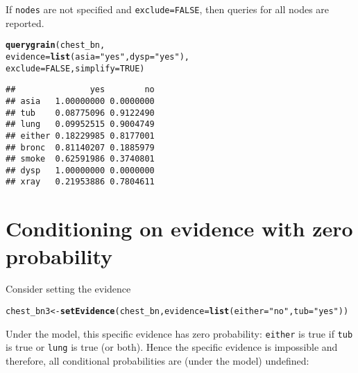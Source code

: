 \documentclass[10pt]{article}\usepackage[]{graphicx}\usepackage[]{xcolor}
\makeatletter
\newcommand{\hlnum}[1]{\textcolor[rgb]{0.686,0.059,0.569}{#1}}%
\newcommand{\hlstr}[1]{\textcolor[rgb]{0.192,0.494,0.8}{#1}}%
\newcommand{\hlstd}[1]{\textcolor[rgb]{0.345,0.345,0.345}{#1}}%
\newcommand{\hlkwb}[1]{\textcolor[rgb]{0.69,0.353,0.396}{#1}}%
\newcommand{\hlkwc}[1]{\textcolor[rgb]{0.333,0.667,0.333}{#1}}%
\newcommand{\hlkwd}[1]{\textcolor[rgb]{0.737,0.353,0.396}{\textbf{#1}}}%
\newenvironment{kframe}{%
 \def\at@end@of@kframe{}%
 \ifinner\ifhmode%
  \def\at@end@of@kframe{\end{minipage}}%
  \begin{minipage}{\columnwidth}%
 \fi\fi%
 \def\FrameCommand##1{\hskip\@totalleftmargin \hskip-\fboxsep
 \colorbox{shadecolor}{##1}\hskip-\fboxsep
     \hskip-\linewidth \hskip-\@totalleftmargin \hskip\columnwidth}%
 \MakeFramed {\advance\hsize-\width
   \@totalleftmargin\z@ \linewidth\hsize
   \@setminipage}}%
 {\par\unskip\endMakeFramed%
 \at@end@of@kframe}
\newenvironment{knitrout}{}{} %
\def\code#1{{\texttt{#1}}}
\makeatother
\begin{document}
\begin{enumerate}
If \code{nodes} are not specified and \code{exclude=FALSE}, then queries for all nodes are reported.

\begin{knitrout}
\color{fgcolor}\begin{kframe}
\begin{alltt}
\hlkwd{querygrain}\hlstd{(chest_bn,}
           \hlkwc{evidence}\hlstd{=}\hlkwd{list}\hlstd{(}\hlkwc{asia}\hlstd{=}\hlstr{"yes"}\hlstd{,} \hlkwc{dysp}\hlstd{=}\hlstr{"yes"}\hlstd{),}
           \hlkwc{exclude} \hlstd{=} \hlnum{FALSE}\hlstd{,} \hlkwc{simplify} \hlstd{=} \hlnum{TRUE}\hlstd{)}
\end{alltt}
\begin{verbatim}
##               yes        no
## asia   1.00000000 0.0000000
## tub    0.08775096 0.9122490
## lung   0.09952515 0.9004749
## either 0.18229985 0.8177001
## bronc  0.81140207 0.1885979
## smoke  0.62591986 0.3740801
## dysp   1.00000000 0.0000000
## xray   0.21953886 0.7804611
\end{verbatim}
\end{kframe}
\end{knitrout}


\end{enumerate}



\section{Conditioning on evidence with zero probability}
\label{sec:zero-probabilities}

Consider setting the evidence
\begin{knitrout}
\color{fgcolor}\begin{kframe}
\begin{alltt}
\hlstd{chest_bn3} \hlkwb{<-} \hlkwd{setEvidence}\hlstd{(chest_bn,} \hlkwc{evidence}\hlstd{=}\hlkwd{list}\hlstd{(}\hlkwc{either}\hlstd{=}\hlstr{"no"}\hlstd{,} \hlkwc{tub}\hlstd{=}\hlstr{"yes"}\hlstd{))}
\end{alltt}
\end{kframe}
\end{knitrout}

Under the model, this specific evidence has zero probability:
\verb|either| is true if \verb|tub| is true or \verb|lung| is true (or
both). Hence the specific evidence is impossible and therefore, all
conditional probabilities are (under the model) undefined:
\end{document}
